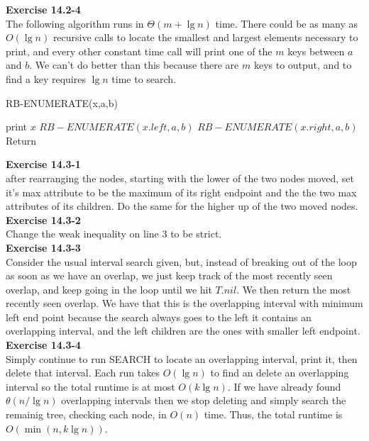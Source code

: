\documentclass{article}
\begin{document}
\noindent\textbf{Exercise 14.2-4}\\

The following algorithm runs in $\Theta(m+\lg n)$ time.  There could be as many as $O(\lg n)$ recursive calls to locate the smallest and largest elements necessary to print, and every other constant time call will print one of the $m$ keys between $a$ and $b$.  We can't do better than this because there are $m$ keys to output, and to find a key requires $\lg n$ time to search.

\begin{algorithm}
\caption{RB-ENUMERATE(x,a,b)}
\begin{algorithmic}
	\State print $x$
\EndIf
{}
	\State $RB-ENUMERATE(x.left, a, b)$
\EndIf
{}
	\State $RB-ENUMERATE(x.right, a, b)$
\EndIf
\State Return
\end{algorithmic}
\end{algorithm}

\noindent\textbf{ Exercise 14.3-1} \\

after rearranging the nodes, starting with the lower of the two nodes moved, set it's max attribute to be the maximum of its right endpoint and the the two max attributes of its children. Do the same for the higher up of the two moved nodes.\\

\noindent\textbf{Exercise 14.3-2}\\

Change the weak inequality on line 3 to be strict. \\


\noindent\textbf{ Exercise 14.3-3} \\

Consider the usual interval search given, but, instead of breaking out of the loop as soon as we have an overlap, we just keep track of the most recently seen overlap, and keep going in the loop until we hit $T.nil$. We then return the most recently seen overlap. We have that this is the overlapping interval with minimum left end point because the search always goes to the left it contains an overlapping interval, and the left children are the ones with smaller left endpoint.\\

\noindent\textbf{Exercise 14.3-4}\\

Simply continue to run SEARCH to locate an overlapping interval, print it, then delete that interval.  Each run takes $O(\lg n)$ to find an delete an overlapping interval so the total runtime is at most $O(k \lg n)$. If we have already found $\theta(n/\lg n)$ overlapping intervals then we stop deleting and simply search the remainig tree, checking each node, in $O(n)$ time.  Thus, the total runtime is $O(\min(n, k\lg n))$.\\
\end{document}
